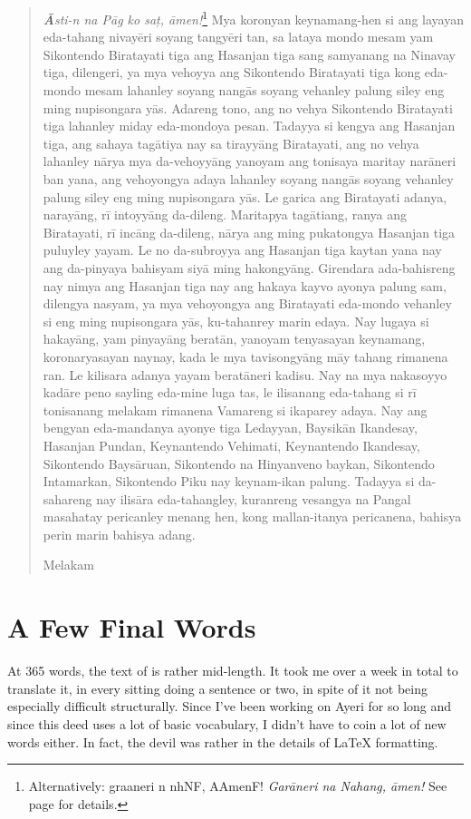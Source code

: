 \documentclass[12pt,paper=a4]{scrartcl}
\newcommand{\fw}[1]{\textit{#1}} %
\newcommand{\ayr}[1]{{\Tagati #1}}
\begin{document}
\begin{quotation}
	\fw{\textbf{Ā}sti-n na Pāg ko saț, āmen!}\footnote{Alternatively:
		\ayr{graaneri n nhNF, AAmenF!} \fw{Garāneri na Nahang, āmen!}
		See page \pageref{ex:innomine} for details.} %
	Mya koronyan keynamang-hen si ang layayan eda-tahang nivayēri soyang 
		tangyēri tan, sa lataya mondo mesam yam Sikontendo Biratayati 
		tiga ang Hasanjan tiga sang samyanang na Nina\-vay tiga, 
		dilengeri, ya mya vehoyya ang Sikontendo Biratayati tiga kong 
		eda-mondo mesam lahanley soyang nangās soyang vehanley palung 
		siley eng ming nupisongara yās. %
	Adareng tono, ang no vehya Sikontendo Birata\-yati tiga lahanley miday 
		eda-mondoya pesan. %
	Tadayya si kengya ang Hasanjan tiga, ang sahaya tagātiya nay sa 
		tirayyāng Birata\-yati, ang no vehya lahanley nārya mya 
		da-vehoyyāng yanoyam ang tonisaya maritay narāneri ban yana, ang 
		vehoyongya adaya lahanley soyang nangās soyang vehanley palung 
		siley eng ming nupisongara yās. %
	Le garica ang Biratayati adanya, narayāng, rī intoyyāng da-dileng. %
	Maritapya tagātiang, ranya ang Biratayati, rī incāng da-dileng, 
		nārya ang ming pukatongya Hasanjan tiga puluyley yayam. %
	Le no da-subroyya ang Hasanjan tiga kaytan yana nay ang da-pinyaya 
		bahisyam siyā ming hakongyāng. %
	Girendara ada-bahisreng nay nimya ang Hasanjan tiga nay ang hakaya kayvo 
		ayonya palung sam, dilengya nasyam, ya mya vehoyongya ang 
		Biratayati eda-mondo vehanley si eng ming nupisongara yās, 
		ku-tahanrey marin edaya. %
	Nay lugaya si hakayāng, yam pinyayāng beratān, yanoyam 
		tenyasayan keynamang, koronaryasayan naynay, kada le mya 
		tavisongyāng māy tahang rimanena ran. %
	Le kilisara adanya yayam beratāneri kadisu. %
	Nay na mya nakasoyyo kadāre peno sayling eda-mine luga tas, le ilisanang 
		eda-tahang si rī tonisanang melakam rimanena Vamareng si 
		ikaparey adaya. %
	Nay ang bengyan eda-mandanya ayonye tiga Ledayyan, Baysikān Ikandesay, 
		Hasanjan Pundan, Keynantendo Vehimati, Keynantendo Ikandesay, 
		Sikontendo Baysāruan, Sikontendo na Hinyanveno baykan, 
		Sikontendo Intamarkan, Sikontendo Piku nay keynam-ikan palung. %
	Tadayya si da-sahareng nay ilisāra eda-tahangley, kuranreng vesangya na 
		Pangal masahatay pericanley menang hen, kong mallan-itanya 
		pericanena, bahisya perin marin bahisya adang. %
	\begin{center}
		Melakam
	\end{center}
\end{quotation}

\section{A Few Final Words}
At 365 words, the text of  is rather mid-length. It took 
me over a week in total to translate it, in every sitting doing a sentence or 
two, in spite of it not being especially difficult structurally. Since I've been 
working on Ayeri for so long and since this deed uses a lot of basic vocabulary, 
I didn't have to coin a lot of new words either. In fact, the devil was rather 
in the details of \LaTeX{} formatting.
\end{document}
